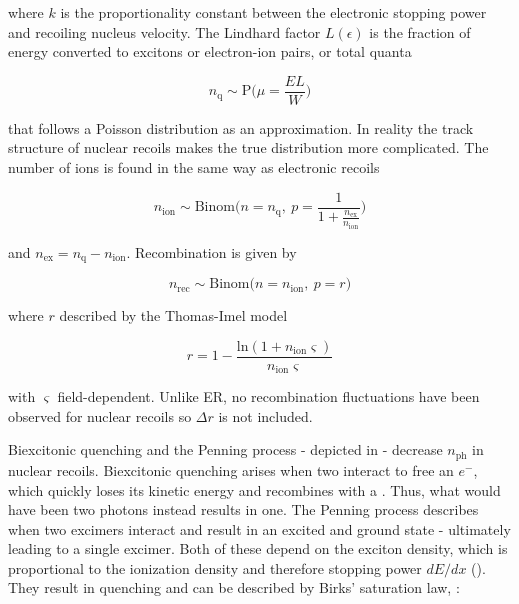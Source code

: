 \vspace{-20pt}

\noindent where $k$ is the proportionality constant between the electronic stopping power and recoiling nucleus velocity.  The Lindhard
factor $L(\epsilon )$ is the fraction of energy converted to excitons or electron-ion pairs, or total quanta

\vspace{-10pt}

\begin{equation}
n_{\mathrm{q}} \sim \mathrm{P} \bigg( \mu = \frac{E L}{W} \bigg)
\label{eq:er_nr_calibrations_parameter_determ_nr_quanta}
\end{equation}

\noindent that follows a Poisson distribution as an approximation.  In reality the track structure of nuclear recoils makes the true
distribution more complicated.  The number of ions is found in the same way as electronic recoils

\vspace{-5pt}

\begin{equation}
n_{\mathrm{ion}} \sim \mathrm{Binom} \Bigg(n = n_{\mathrm{q}},\ p = \frac{1}{1 + \frac{n_{\mathrm{ex}}}{n_{\mathrm{ion}}}} \Bigg)
\end{equation}

\noindent and $n_{\mathrm{ex}} = n_{\mathrm{q}} - n_{\mathrm{ion}}$.  Recombination is given by

\vspace{-10pt}

\begin{equation}
n_{\mathrm{rec}} \sim \mathrm{Binom} \big(n = n_{\mathrm{ion}},\ p = r \big)
\end{equation}

\noindent where $r$ described by the Thomas-Imel model

\vspace{-10pt}

\begin{equation}
r = 1 - \frac{\mathrm{ln} (1 + n_{\mathrm{ion}} \varsigma)}{n_{\mathrm{ion}} \varsigma}
\end{equation}

\noindent with $\varsigma$ field-dependent.  Unlike ER, no recombination fluctuations have been observed for nuclear recoils so
$\Delta r$ is not included.

Biexcitonic quenching and the Penning process - depicted in  - decrease
$n_{\mathrm{ph}}$ in nuclear recoils.  Biexcitonic quenching arises when two
 interact to free an $e^-$, which quickly loses its kinetic energy
and recombines with a .  Thus, what would have been two photons instead results in one.  The Penning process describes when
two excimers interact and result in an excited and ground state  - ultimately leading to a single excimer.  Both of these
depend on the exciton density, which
is proportional to the ionization density and therefore stopping power $dE / dx$ ().  They result in quenching
and can be
described by Birks' saturation law,  :

